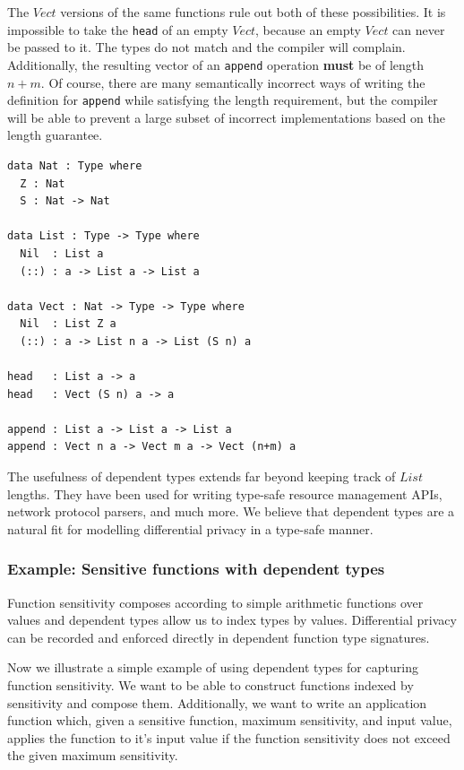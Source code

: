 \documentclass[12pt]{article}
\begin{document}
The $Vect$ versions of the same functions rule out both of these possibilities.
It is impossible to take the \texttt{head} of an empty $Vect$, because an empty $Vect$ can never be passed to it.
The types do not match and the compiler will complain.
Additionally, the resulting vector of an \texttt{append} operation \textbf{must} be of length $n+m$.
Of course, there are many semantically incorrect ways of writing the definition for \texttt{append} while satisfying the length requirement, but the compiler will be able to prevent a large subset of incorrect implementations based on the length guarantee.

\begin{lstlisting}[caption=List and Vect,label={lst:vect}]
data Nat : Type where
  Z : Nat
  S : Nat -> Nat

data List : Type -> Type where
  Nil  : List a
  (::) : a -> List a -> List a

data Vect : Nat -> Type -> Type where
  Nil  : List Z a
  (::) : a -> List n a -> List (S n) a

head   : List a -> a
head   : Vect (S n) a -> a

append : List a -> List a -> List a
append : Vect n a -> Vect m a -> Vect (n+m) a
\end{lstlisting}

The usefulness of dependent types extends far beyond keeping track of $List$ lengths.
They have been used for writing type-safe resource management APIs, network protocol parsers, and much more\cite{conf/plpv/Brady11}.
We believe that dependent types are a natural fit for modelling differential privacy in a type-safe manner.

\subsubsection{Example: Sensitive functions with dependent types}

Function sensitivity composes according to simple arithmetic functions over values and dependent types allow us to index types by values.
Differential privacy can be recorded and enforced directly in dependent function type signatures.

Now we illustrate a simple example of using dependent types for capturing function sensitivity.
We want to be able to construct functions indexed by sensitivity and compose them.
Additionally, we want to write an application function which, given a sensitive function, maximum sensitivity, and input value, applies the function to it's input value if the function sensitivity does not exceed the given maximum sensitivity.
\end{document}
